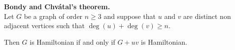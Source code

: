 \documentclass{article}
\begin{document}
\textbf{Bondy and Chv\'atal's theorem.}\\
Let $G$ be a graph of order $n\ge 3$ and suppose that $u$ and $v$ are distinct non adjacent vertices such that $\deg(u)+\deg(v)\ge n$.

Then $G$ is Hamiltonian if and only if $G+uv$ is Hamiltonian.
\end{document}
